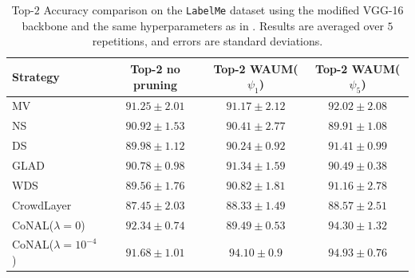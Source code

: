 \begin{table}[htbp]
    \centering
    \caption{Top-$2$ Accuracy comparison on the \texttt{LabelMe} dataset using the modified VGG-16 backbone and the same hyperparameters as in . Results are averaged over $5$ repetitions, and errors are standard deviations.
    }
    \begin{tabular}{lccc}
        \textbf{Strategy} & \textbf{Top-2 no pruning} & \textbf{Top-2 WAUM($\psi_1$)} & \textbf{Top-2 WAUM($\psi_5$)} \\
        \hline
        MV   & $91.25 \pm 2.01$ & $91.17 \pm 2.12$ & $92.02 \pm 2.08 $ \\
        NS   & $90.92 \pm 1.53$ & $90.41 \pm 2.77$ & $89.91 \pm 1.08$ \\
        DS   & $89.98 \pm 1.12$ & $90.24 \pm 0.92$ & $91.41\pm 0.99$ \\
        GLAD & $90.78 \pm 0.98$ & $91.34 \pm 1.59$ & $90.49 \pm 0.38$ \\
        WDS  & $89.56 \pm 1.76 $ & $90.82 \pm 1.81$ & $91.16 \pm 2.78$ \\
        CrowdLayer & $87.45 \pm 2.03$ & $88.33 \pm 1.49$ & $88.57 \pm 2.51$ \\
        CoNAL($\lambda=0$) & $92.34 \pm 0.74$ & $89.49 \pm 0.53$ & $94.30 \pm 1.32$ \\
        CoNAL($\lambda=10^{-4}$) & $91.68 \pm 1.01$ & $94.10  \pm 0.9$ & $94.93 \pm 0.76$\\
    \end{tabular}
    \label{tab:accuracy_comparison_top2}
\end{table}

